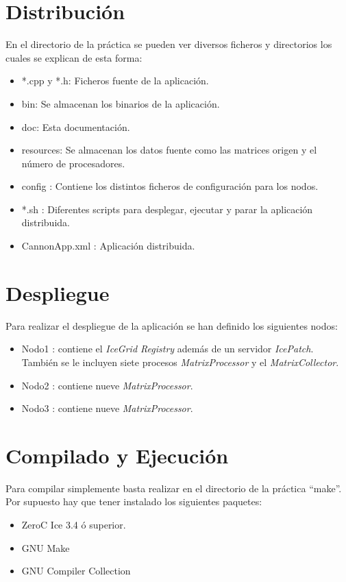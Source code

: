 

\section{Distribución}

En el directorio de la práctica se pueden ver diversos ficheros y directorios los cuales se explican de esta forma:

\begin{itemize}
\item *.cpp y *.h: Ficheros fuente de la aplicación.
\item bin: Se almacenan los binarios de la aplicación.
\item doc: Esta documentación.
\item resources: Se almacenan los datos fuente como las matrices origen y el número de procesadores.
\item config : Contiene los distintos ficheros de configuración para los nodos.
\item *.sh : Diferentes scripts para desplegar, ejecutar y parar la aplicación distribuida.
\item CannonApp.xml : Aplicación distribuida.
\end{itemize}

\section{Despliegue}

Para realizar el despliegue de la aplicación se han definido los siguientes nodos:
\begin{itemize}

\item Nodo1 : contiene el \emph{IceGrid Registry} además de un servidor \emph{IcePatch}. También se le incluyen siete procesos \emph{MatrixProcessor} y el \emph{MatrixCollector}.
\item Nodo2 : contiene nueve \emph{MatrixProcessor}.
\item Nodo3 : contiene nueve \emph{MatrixProcessor}.
\end{itemize}



\section{Compilado y Ejecución} 

Para compilar simplemente basta realizar en el directorio de la práctica ``make''.
Por supuesto hay que tener instalado los siguientes paquetes:
\begin{itemize}
\item ZeroC Ice 3.4 ó superior.
\item GNU Make
\item GNU Compiler Collection
\end{itemize}

